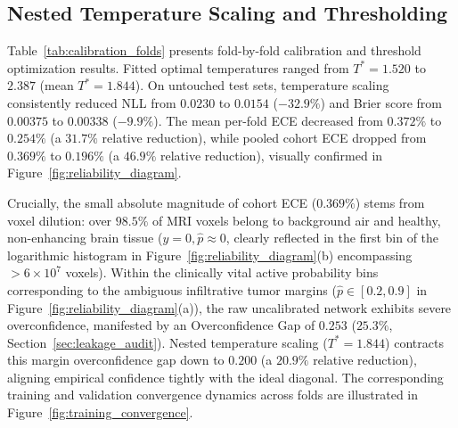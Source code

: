 \documentclass[preprint,3p,times,onecolumn]{elsarticle}
\begin{document}
\subsection{Nested Temperature Scaling and Thresholding}
Table~\ref{tab:calibration_folds} presents fold-by-fold calibration and threshold optimization results. Fitted optimal temperatures ranged from $T^* = 1.520$ to $2.387$ (mean $T^* = 1.844$). On untouched test sets, temperature scaling consistently reduced NLL from $0.0230$ to $0.0154$ ($-32.9\%$) and Brier score from $0.00375$ to $0.00338$ ($-9.9\%$). The mean per-fold ECE decreased from $0.372\%$ to $0.254\%$ (a $31.7\%$ relative reduction), while pooled cohort ECE dropped from $0.369\%$ to $0.196\%$ (a $46.9\%$ relative reduction), visually confirmed in Figure~\ref{fig:reliability_diagram}.

Crucially, the small absolute magnitude of cohort ECE ($0.369\%$) stems from voxel dilution: over $98.5\%$ of MRI voxels belong to background air and healthy, non-enhancing brain tissue ($y=0, \hat{p} \approx 0$, clearly reflected in the first bin of the logarithmic histogram in Figure~\ref{fig:reliability_diagram}(b) encompassing $>6 \times 10^7$ voxels). Within the clinically vital active probability bins corresponding to the ambiguous infiltrative tumor margins ($\hat{p} \in [0.2, 0.9]$ in Figure~\ref{fig:reliability_diagram}(a)), the raw uncalibrated network exhibits severe overconfidence, manifested by an Overconfidence Gap of $0.253$ ($25.3\%$, Section~\ref{sec:leakage_audit}). Nested temperature scaling ($T^* = 1.844$) contracts this margin overconfidence gap down to $0.200$ (a $20.9\%$ relative reduction), aligning empirical confidence tightly with the ideal diagonal. The corresponding training and validation convergence dynamics across folds are illustrated in Figure~\ref{fig:training_convergence}.
\end{document}
